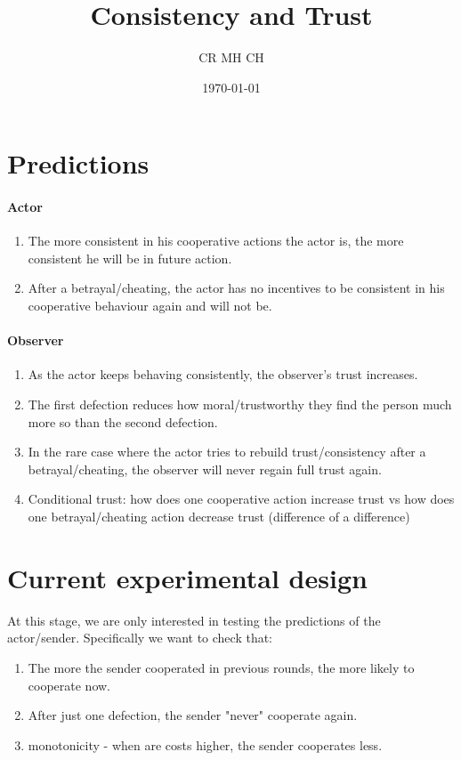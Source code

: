 \documentclass[11pt]{article}
\title{Consistency and Trust}
\date{\today}
\author{CR MH CH}
\theoremstyle{plainCl1}
\begin{document}
\maketitle
\onehalfspacing

\section{Predictions}

\paragraph{Actor}

\begin{enumerate}
    \item The more consistent in his cooperative actions the actor is, the more consistent he will be in future action.
    \item After a betrayal/cheating, the actor has no incentives to be consistent in his cooperative behaviour again and will not be. 
\end{enumerate}

\paragraph{Observer}

\begin{enumerate}
    \item As the actor keeps behaving consistently, the observer's trust increases.
    \item The first defection reduces how moral/trustworthy they find the person much more so than the second defection.
    \item In the rare case where the actor tries to rebuild trust/consistency after a betrayal/cheating, the observer will never regain full trust again.
    \item Conditional trust: how does one cooperative action increase trust vs how does one betrayal/cheating action decrease trust (difference of a difference)
\end{enumerate}

\section{Current experimental design}

\noindent
At this stage, we are only interested in testing the predictions of the actor/sender. Specifically we want to check that:
\begin{enumerate}
    \item The more the sender cooperated in previous rounds, the more likely to cooperate now.
    \item After just one defection, the sender "never" cooperate again.
    \item monotonicity - when are costs higher, the sender cooperates less. 
\end{enumerate}
\end{document}
